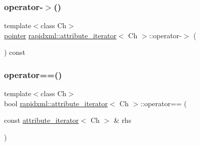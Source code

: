 \subsubsection{\texorpdfstring{operator-\/$>$()}{operator->()}\hspace{0.1cm}{\footnotesize\ttfamily [2/2]}}
{\footnotesize\ttfamily template$<$class Ch$>$ \\
\mbox{\hyperlink{classrapidxml_1_1attribute__iterator_a69acc2e60270d6a062c03c9cb1cf2aa7}{pointer}} \mbox{\hyperlink{classrapidxml_1_1attribute__iterator}{rapidxml\+::attribute\+\_\+iterator}}$<$ Ch $>$\+::operator-\/$>$ (\begin{DoxyParamCaption}{ }\end{DoxyParamCaption}) const\hspace{0.3cm}{\ttfamily [inline]}}

\mbox{\label{classrapidxml_1_1attribute__iterator_ab1dc8dd11d21e145a4e3f76d46aead0d}} 
\subsubsection{\texorpdfstring{operator==()}{operator==()}\hspace{0.1cm}{\footnotesize\ttfamily [1/2]}}
{\footnotesize\ttfamily template$<$class Ch$>$ \\
bool \mbox{\hyperlink{classrapidxml_1_1attribute__iterator}{rapidxml\+::attribute\+\_\+iterator}}$<$ Ch $>$\+::operator== (\begin{DoxyParamCaption}\item[{const \mbox{\hyperlink{classrapidxml_1_1attribute__iterator}{attribute\+\_\+iterator}}$<$ Ch $>$ \&}]{rhs }\end{DoxyParamCaption})\hspace{0.3cm}{\ttfamily [inline]}}

\mbox{\label{classrapidxml_1_1attribute__iterator_ab1dc8dd11d21e145a4e3f76d46aead0d}} 
